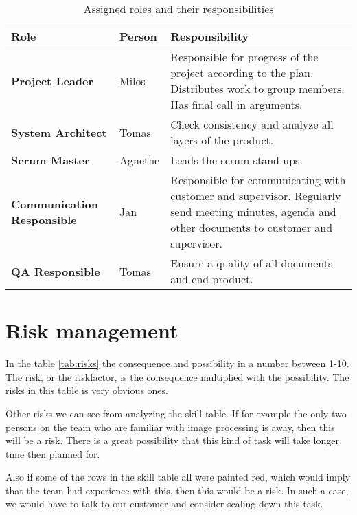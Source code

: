 \documentclass{article}
\newcommand{\ra}[1]{\renewcommand{\arraystretch}{#1}}
\begin{document}
\begin{table*}\centering \ra{1.3}
    \caption{Assigned roles and their responsibilities}
    \label{tab:roles}
    \vspace{2mm}
    \begin{tabularx}{\textwidth}{llX}
    \toprule
    Role    & Person   & Responsibility \\
    \midrule
    \textbf{Project Leader}             & Milos &
        Responsible for progress of the project according to the plan.
        Distributes work to group members.
        Has final call in arguments.\\
    \textbf{System Architect}             & Tomas &
        Check consistency and analyze all layers of the product. \\
    \textbf{Scrum Master}             & Agnethe &
        Leads the scrum stand-ups. \\
    \textbf{Communication Responsible}  & Jan &
        Responsible for communicating with customer and supervisor.
        Regularly send meeting minutes, agenda and other documents to customer and supervisor. \\ 
    \textbf{QA Responsible} & Tomas &
        Ensure a quality of all documents and end-product.
        \\ 
    \bottomrule
    \end{tabularx}
\end{table*}



\section{Risk management}

In the table \ref{tab:risks} the consequence and possibility in a number between 1-10. The risk, or the riskfactor, is the consequence multiplied with the possibility. The risks in this table is very obvious ones. 

Other risks we can see from analyzing the skill table. If for example the only two persons on the team who are familiar with image processing is away, then this will be a risk. There is a great possibility that this kind of task will take longer time then planned for. 

Also if some of the rows in the skill table all were painted red, which would imply that the team had experience with this, then this would be a risk. In such a case, we would have to talk to our customer and consider scaling down this task. 
\end{document}
